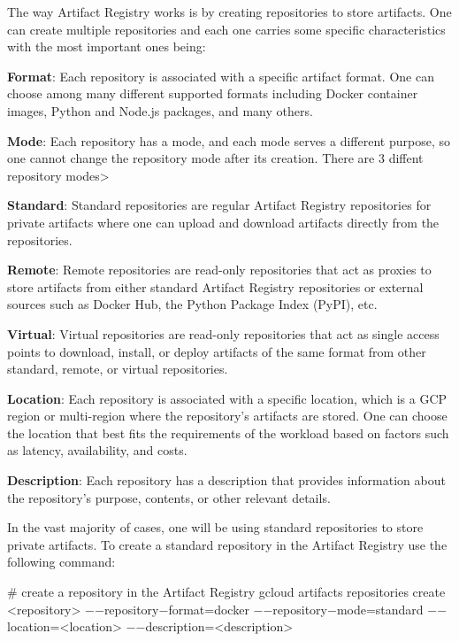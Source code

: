 The way Artifact Registry works is by creating repositories to store artifacts. One can create multiple repositories
and each one carries some specific characteristics with the most important ones being:
\bit
\item \textbf{Format}: Each repository is associated with a specific artifact format. One can choose among
many different supported formats including Docker container images, Python and Node.js packages, and many others.
\item \textbf{Mode}: Each repository has a mode, and each mode serves a different purpose, so one cannot change
the repository mode after its creation. There are 3 diffent repository modes>
\bit
\item \textbf{Standard}: Standard repositories are regular Artifact Registry repositories for private artifacts where
one can upload and download artifacts directly from the repositories.
\item \textbf{Remote}: Remote repositories are read-only repositories that act as proxies to store artifacts from either
standard Artifact Registry repositories or external sources such as Docker Hub, the Python Package Index (PyPI), etc.
\item \textbf{Virtual}: Virtual repositories are read-only repositories that act as single access points to download,
install, or deploy artifacts of the same format from other standard, remote, or virtual repositories.
\eit
\item \textbf{Location}: Each repository is associated with a specific location, which is a GCP region or multi-region
where the repository's artifacts are stored. One can choose the location that best fits the requirements of the workload
based on factors such as latency, availability, and costs.
\item \textbf{Description}: Each repository has a description that provides information about the repository's purpose,
contents, or other relevant details.
\eit

In the vast majority of cases, one will be using standard repositories to store private artifacts. To create a standard
repository in the Artifact Registry use the following command:
\begin{bash}
# create a repository in the Artifact Registry
gcloud artifacts repositories create <repository>
    $-$$-$repository$-$format=docker
    $-$$-$repository$-$mode=standard
    $-$$-$location=<location>
    $-$$-$description=<description>
\end{bash}

